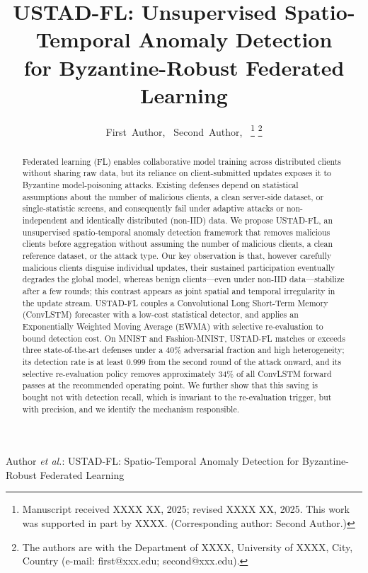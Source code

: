 \documentclass[journal]{IEEEtran}
\begin{document}
\title{USTAD-FL: Unsupervised Spatio-Temporal Anomaly Detection\\for Byzantine-Robust Federated Learning}

\author{First~Author,~
Second~Author,~
\thanks{Manuscript received XXXX XX, 2025; revised XXXX XX, 2025. This work was supported in part by XXXX. (Corresponding author: Second Author.)}
\thanks{The authors are with the Department of XXXX, University of XXXX, City, Country (e-mail: first@xxx.edu; second@xxx.edu).}}

{Author \MakeLowercase{\textit{et al.}}: USTAD-FL: Spatio-Temporal Anomaly Detection for Byzantine-Robust Federated Learning}

\maketitle

\begin{abstract}
Federated learning (FL) enables collaborative model training across distributed clients without sharing raw data, but its reliance on client-submitted updates exposes it to Byzantine model-poisoning attacks. Existing defenses depend on statistical assumptions about the number of malicious clients, a clean server-side dataset, or single-statistic screens, and consequently fail under adaptive attacks or non-independent and identically distributed (non-IID) data. We propose USTAD-FL, an unsupervised spatio-temporal anomaly detection framework that removes malicious clients before aggregation without assuming the number of malicious clients, a clean reference dataset, or the attack type. Our key observation is that, however carefully malicious clients disguise individual updates, their sustained participation eventually degrades the global model, whereas benign clients---even under non-IID data---stabilize after a few rounds; this contrast appears as joint spatial and temporal irregularity in the update stream. USTAD-FL couples a Convolutional Long Short-Term Memory (ConvLSTM) forecaster with a low-cost statistical detector, and applies an Exponentially Weighted Moving Average (EWMA) with selective re-evaluation to bound detection cost. On MNIST and Fashion-MNIST, USTAD-FL matches or exceeds three state-of-the-art defenses under a $40\%$ adversarial fraction and high heterogeneity; its detection rate is at least $0.999$ from the second round of the attack onward, and its selective re-evaluation policy removes approximately 34\% of all ConvLSTM forward passes at the recommended operating point. We further show that this saving is bought not with detection recall, which is invariant to the re-evaluation trigger, but with precision, and we identify the mechanism responsible.
\end{abstract}
\end{document}
